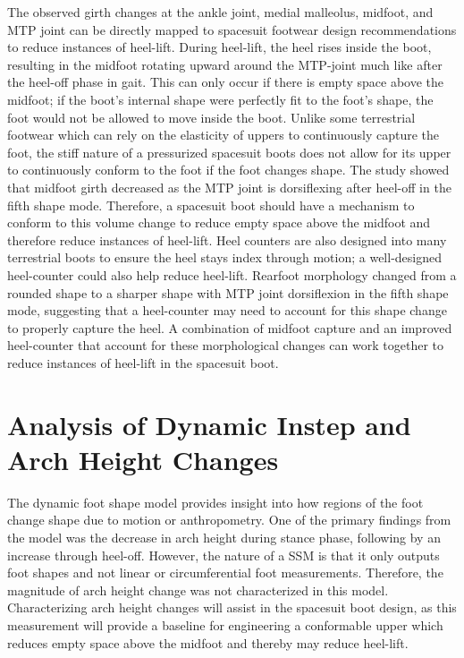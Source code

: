 \documentclass[defaultstyle,11pt]{comps}
\begin{document}
The observed girth changes at the ankle joint, medial malleolus, midfoot, and MTP joint can be directly mapped to spacesuit footwear design recommendations to reduce instances of heel-lift.
During heel-lift, the heel rises inside the boot, resulting in the midfoot rotating upward around the MTP-joint much like after the heel-off phase in gait.
This can only occur if there is empty space above the midfoot; if the boot's internal shape were perfectly fit to the foot's shape, the foot would not be allowed to move inside the boot.
Unlike some terrestrial footwear which can rely on the elasticity of uppers to continuously capture the foot, the stiff nature of a pressurized spacesuit boots does not allow for its upper to continuously conform to the foot if the foot changes shape.
The study showed that midfoot girth decreased as the MTP joint is dorsiflexing after heel-off in the fifth shape mode.
Therefore, a spacesuit boot should have a mechanism to conform to this volume change to reduce empty space above the midfoot and therefore reduce instances of heel-lift.
Heel counters are also designed into many terrestrial boots to ensure the heel stays index through motion; a well-designed heel-counter could also help reduce heel-lift.
Rearfoot morphology changed from a rounded shape to a sharper shape with MTP joint dorsiflexion in the fifth shape mode, suggesting that a heel-counter may need to account for this shape change to properly capture the heel.
A combination of midfoot capture and an improved heel-counter that account for these morphological changes can work together to reduce instances of heel-lift in the spacesuit boot.

\hypertarget{analysis-of-dynamic-instep-and-arch-height-changes}{%
\section{Analysis of Dynamic Instep and Arch Height Changes}\label{analysis-of-dynamic-instep-and-arch-height-changes}}

The dynamic foot shape model provides insight into how regions of the foot change shape due to motion or anthropometry.
One of the primary findings from the model was the decrease in arch height during stance phase, following by an increase through heel-off.
However, the nature of a SSM is that it only outputs foot shapes and not linear or circumferential foot measurements.
Therefore, the magnitude of arch height change was not characterized in this model.
Characterizing arch height changes will assist in the spacesuit boot design, as this measurement will provide a baseline for engineering a conformable upper which reduces empty space above the midfoot and thereby may reduce heel-lift.
\end{document}
